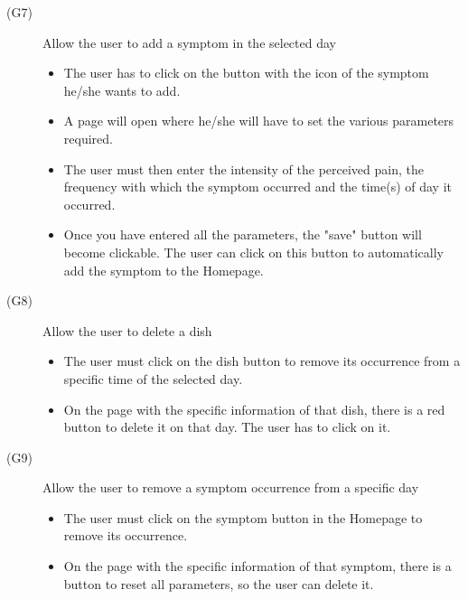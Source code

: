 \documentclass [12pt]{article}
\begin{document}
\begin{description}
\item[(G7)]Allow the user to add a symptom in the selected day
\begin{itemize}
\item The user has to click on the button with the icon of the symptom he/she wants to add. 
\item A page will open where he/she will have to set the various parameters required. 
\item The user must then enter the intensity of the perceived pain, the frequency with which the symptom occurred and the time(s) of day it occurred. 
\item Once you have entered all the parameters, the "save" button will become clickable. The user can click on this button to automatically add the symptom to the Homepage.
\end{itemize}
\end{description}

\begin{description}
\item[(G8)]Allow the user to delete a dish
\begin{itemize}
\item The user must click on the dish button to remove its occurrence from a specific time of the selected day. 
\item On the page with the specific information of that dish, there is a red button to delete it on that day. The user has to click on it.
\end{itemize}
\end{description}

\begin{description}
\item[(G9)]Allow the user to remove a symptom occurrence from a specific day
\begin{itemize}
\item The user must click on the symptom button in the Homepage to remove its occurrence. 
\item On the page with the specific information of that symptom, there is a button to reset all parameters, so the user can delete it.
\end{itemize}
\end{description}
\end{document}
